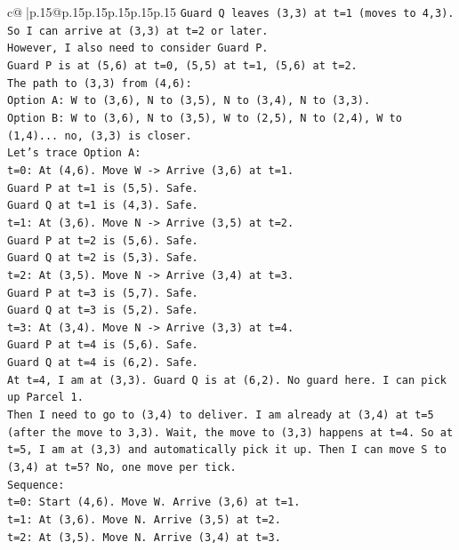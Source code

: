 \documentclass{article}
\begin{document}
{\begin{supertabular}{c@{$\;$}|p{.15\linewidth}@{}p{.15\linewidth}p{.15\linewidth}p{.15\linewidth}p{.15\linewidth}p{.15\linewidth}}
{{{\texttt{Guard Q leaves (3,3) at t=1 (moves to 4,3).} \\
\texttt{So I can arrive at (3,3) at t=2 or later.} \\
\texttt{However, I also need to consider Guard P.} \\
\texttt{Guard P is at (5,6) at t=0, (5,5) at t=1, (5,6) at t=2.} \\
\texttt{The path to (3,3) from (4,6):} \\
\texttt{Option A: W to (3,6), N to (3,5), N to (3,4), N to (3,3).} \\
\texttt{Option B: W to (3,6), N to (3,5), W to (2,5), N to (2,4), W to (1,4)... no, (3,3) is closer.} \\
\texttt{Let's trace Option A:} \\
\texttt{t=0: At (4,6). Move W {-}> Arrive (3,6) at t=1.} \\
\texttt{Guard P at t=1 is (5,5). Safe.} \\
\texttt{Guard Q at t=1 is (4,3). Safe.} \\
\texttt{t=1: At (3,6). Move N {-}> Arrive (3,5) at t=2.} \\
\texttt{Guard P at t=2 is (5,6). Safe.} \\
\texttt{Guard Q at t=2 is (5,3). Safe.} \\
\texttt{t=2: At (3,5). Move N {-}> Arrive (3,4) at t=3.} \\
\texttt{Guard P at t=3 is (5,7). Safe.} \\
\texttt{Guard Q at t=3 is (5,2). Safe.} \\
\texttt{t=3: At (3,4). Move N {-}> Arrive (3,3) at t=4.} \\
\texttt{Guard P at t=4 is (5,6). Safe.} \\
\texttt{Guard Q at t=4 is (6,2). Safe.} \\
\texttt{At t=4, I am at (3,3). Guard Q is at (6,2). No guard here. I can pick up Parcel 1.} \\
\texttt{Then I need to go to (3,4) to deliver. I am already at (3,4) at t=5 (after the move to 3,3). Wait, the move to (3,3) happens at t=4. So at t=5, I am at (3,3) and automatically pick it up. Then I can move S to (3,4) at t=5? No, one move per tick.} \\
\texttt{Sequence:} \\
\texttt{t=0: Start (4,6). Move W. Arrive (3,6) at t=1.} \\
\texttt{t=1: At (3,6). Move N. Arrive (3,5) at t=2.} \\
\texttt{t=2: At (3,5). Move N. Arrive (3,4) at t=3.} \\
}}}
\end{supertabular}}
\end{document}
